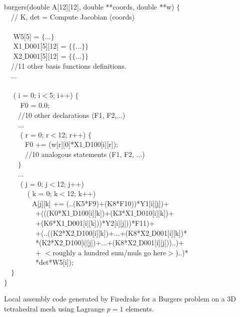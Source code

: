 \documentclass[conference]{IEEEtran}
\begin{document}
\begin{algorithm}[t]
\footnotesize
{} burgers(double A[12][12], double **coords, double **w) $\lbrace$\\
~~// K, det = Compute Jacobian (coords) \\
~~\\
~~ W5[5] = $\lbrace$...$\rbrace$\\
~~ X1$\_$D001[5][12] = $\lbrace\lbrace$...$\rbrace\rbrace$\\
~~ X2$\_$D001[5][12] = $\lbrace\lbrace$...$\rbrace\rbrace$\\
~~//11 other basis functions definitions.\\
~~...\\
~~\\
~~ ( i = 0; i$<$5; i++) $\lbrace$\\
~~~~ F0 = 0.0;\\
~~~~//10 other declarations (F1, F2,...)\\
~~~~...\\
~~~~ ( r = 0; r$<$12; r++) $\lbrace$\\
~~~~~~F0 += (w[r][0]*X1$\_$D100[i][r]);\\
~~~~~~//10 analogous statements (F1, F2, ...)\\
~~~~$\rbrace$\\
~~~~...\\
~~~~ ( j = 0; j$<$12; j++) \\
~~~~~~ ( k = 0; k$<$12; k++) \\
~~~~~~~~A[j][k] += (..(K5*F9)+(K8*F10))*Y1[i][j])+\\
~~~~~~~~~+(((K0*X1$\_$D100[i][k])+(K3*X1$\_$D010[i][k])+\\
~~~~~~~~~+(K6*X1$\_$D001[i][k]))*Y2[i][j]))*F11)+\\
~~~~~~~~~+(..((K2*X2$\_$D100[i][k])+...+(K8*X2$\_$D001[i][k])*\\
~~~~~~~~~*(K2*X2$\_$D100[i][j])+...+(K8*X2$\_$D001[i][j]))..)+\\
~~~~~~~~~+ $<$roughly a hundred sum/muls go here$>$)..)*\\
~~~~~~~~~*det*W5[i]);\\
~~$\rbrace$ \\
$\rbrace$
\caption{Local assembly code generated by Firedrake for a Burgers problem on a 3D tetrahedral mesh using Lagrange $p=1$ elements.}
\label{code:burgers}
\end{algorithm}
\end{document}
